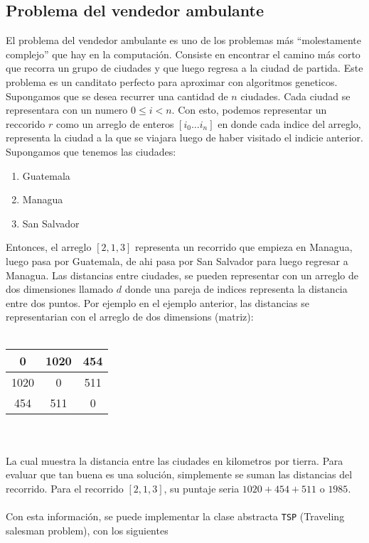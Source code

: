 \documentclass{article}
\begin{document}
\subsection*{Problema del vendedor ambulante}
El problema del vendedor ambulante es uno de los problemas m\'as ``molestamente complejo''
que hay en la computaci\'on. Consiste en encontrar el camino m\'as corto que recorra un
grupo de ciudades y que luego regresa a la ciudad de partida. Este problema es un canditato
perfecto para aproximar con algoritmos geneticos. Supongamos que se desea recurrer una cantidad
de $n$ ciudades. Cada ciudad se representara con un numero $0\leq i < n$. Con esto, podemos
representar un reccorido $r$ como un arreglo de enteros $[i_0 \ldots i_n]$ en donde cada indice
del arreglo, representa la ciudad a la que se viajara luego de haber visitado el indicie anterior.
Supongamos que tenemos las ciudades:
\begin{enumerate}
        \item Guatemala
        \item Managua
        \item San Salvador
\end{enumerate}
Entonces, el arreglo $[2,1,3]$ representa un recorrido que empieza en Managua, luego
pasa por Guatemala, de ahi pasa por San Salvador para luego regresar a Managua. Las distancias
entre ciudades, se pueden representar con un arreglo de dos dimensiones llamado $d$ donde
una pareja de indices representa la distancia entre dos puntos. Por ejemplo en el ejemplo
anterior, las distancias se representarian con el arreglo de dos dimensions (matriz):
\\\\
\begin{tabular}{|c|c|c|}
        \hline
        0 & 1020 & 454\\
        \hline
        1020 & 0 & 511 \\
        \hline
        454 & 511 & 0 \\
        \hline
\end{tabular}
\\\\
La cual muestra la distancia entre las ciudades en kilometros por tierra. Para evaluar
que tan buena es una soluci\'on, simplemente se suman las distancias del recorrido. Para
el recorrido $[2,1,3]$, su puntaje seria $1020+454+511$ o $1985$.
\\\\
Con esta informaci\'on, se puede implementar la clase abstracta \texttt{TSP} (Traveling salesman problem), con los siguientes
\end{document}
